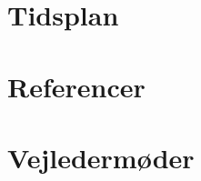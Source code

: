 \thispagestyle{fancy}
\chapter{Tidsplan}
\label{app:tidsplan}

\chapter{Referencer}

\chapter{Vejledermøder}
\label{bilag:vejl}


\newpage
\listoffigures

\newpage
\listoftables